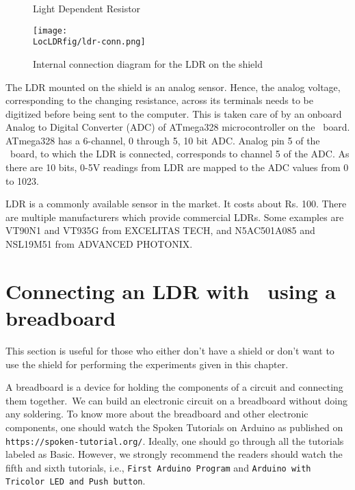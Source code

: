 \begin{figure}
\centering
{} \hfill
{}
\caption{Light Dependent Resistor}
\end{figure}

\begin{figure}
\centering
\texttt{[image: \\LocLDRfig/ldr-conn.png]}
\caption{Internal connection diagram for the LDR on the shield}
\label{fig:ldrconn}
\end{figure}

The LDR mounted on the shield is an analog sensor. Hence, the analog voltage, corresponding to the changing resistance, across its terminals needs to be digitized before being sent to the computer. This is taken care of by an onboard Analog to Digital Converter (ADC) of ATmega328 microcontroller on the \arduino\
board. ATmega328 has a 6-channel, 0 through 5, 10 bit ADC. Analog pin
5 of the \arduino\ board, to which the LDR is connected, corresponds
to channel 5 of the ADC.  As there are 10 bits, 0-5V readings from LDR
are mapped to the ADC values from 0 to 1023. 

LDR is a commonly available sensor in the market. It costs about
Rs. 100. There are multiple manufacturers which provide commercial
LDRs.  Some examples are VT90N1 and VT935G from EXCELITAS TECH, and
N5AC501A085 and NSL19M51 from ADVANCED PHOTONIX. 

\section{Connecting an LDR with \arduino\ using a breadboard}
This section is useful for those who either don't have a shield or don't want to use the shield
for performing the experiments given in this chapter. 

A breadboard is a device for holding the components of a circuit and connecting 
them together. We can build an electronic circuit on a breadboard without doing any 
soldering. To know more about the breadboard and other electronic components, 
one should watch the Spoken Tutorials on Arduino as published on
{\tt https://spoken-tutorial.org/}. Ideally, one should go through all the
tutorials labeled as Basic. However, we strongly recommend the readers should
watch the fifth and sixth tutorials, i.e., {\tt First Arduino Program} and 
{\tt Arduino with Tricolor LED and Push button}.

